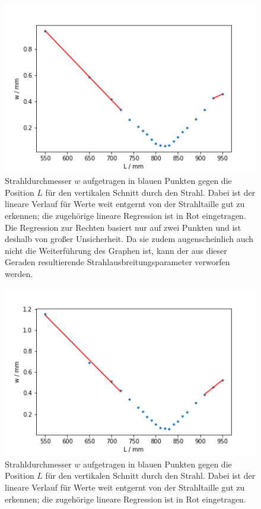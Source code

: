 \begin{figure}[h]
    \centering
    \includegraphics[scale = 0.75]{Bilder/Auswertung/gerfitvh.png}
    \caption{Strahldurchmesser $w$ aufgetragen in blauen Punkten gegen die Position $L$ für den vertikalen Schnitt durch den Strahl. Dabei ist der lineare Verlauf für Werte weit entgernt von der Strahltaille 
    gut zu erkennen; die zugehörige lineare Regression ist in Rot eingetragen. Die Regression zur Rechten basiert nur auf zwei Punkten und ist deshalb von großer Unsicherheit. Da sie zudem augenscheinlich auch 
    nicht die Weiterführung des Graphen ist, kann der aus dieser Geraden resultierende Strahlausbreitungsparameter verworfen werden.}
    \label{pic:gerfitvh}
\end{figure}

\begin{figure}[h]
    \centering
    \includegraphics[scale = 0.75]{Bilder/Auswertung/gerfithh.png}
    \caption{Strahldurchmesser $w$ aufgetragen in blauen Punkten gegen die Position $L$ für den vertikalen Schnitt durch den Strahl. Dabei ist der lineare Verlauf für Werte weit entgernt von der Strahltaille 
    gut zu erkennen; die zugehörige lineare Regression ist in Rot eingetragen.}
    \label{pic:gerfithh}
\end{figure}
\clearpage
